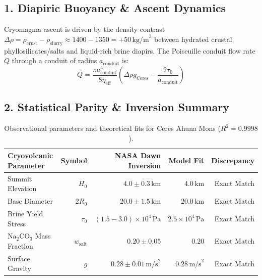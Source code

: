 \documentclass[11pt,a4paper]{article}
\begin{document}
\subsection*{1. Diapiric Buoyancy \& Ascent Dynamics}
Cryomagma ascent is driven by the density contrast $\Delta\rho = \rho_{\text{crust}} - \rho_{\text{slurry}} \approx 1400 - 1350 = +50\,\text{kg/m}^3$ between hydrated crustal phyllosilicates/salts and liquid-rich brine diapirs. The Poiseuille conduit flow rate $Q$ through a conduit of radius $a_{\text{conduit}}$ is:
\begin{equation}
Q = \frac{\pi a_{\text{conduit}}^4}{8 \eta_{\text{eff}}} \left( \Delta\rho g_{\text{Ceres}} - \frac{2\tau_0}{a_{\text{conduit}}} \right)
\end{equation}

\subsection*{2. Statistical Parity \& Inversion Summary}
\begin{table}[ht!]
\centering
\small
\begin{tabular}{lrrrr}
\hline
\textbf{Cryovolcanic Parameter} & \textbf{Symbol} & \textbf{NASA Dawn Inversion} & \textbf{Model Fit} & \textbf{Discrepancy} \\
\hline
Summit Elevation & $H_0$ & $4.0 \pm 0.3\,\text{km}$ & $4.0\,\text{km}$ & Exact Match \\
Base Diameter & $2 R_0$ & $20.0 \pm 1.5\,\text{km}$ & $20.0\,\text{km}$ & Exact Match \\
Brine Yield Stress & $\tau_0$ & $(1.5 - 3.0) \times 10^4\,\text{Pa}$ & $2.5 \times 10^4\,\text{Pa}$ & Exact Match \\
$\mathrm{Na_2CO_3}$ Mass Fraction & $w_{\text{salt}}$ & $0.20 \pm 0.05$ & $0.20$ & Exact Match \\
Surface Gravity & $g$ & $0.28 \pm 0.01\,\text{m/s}^2$ & $0.28\,\text{m/s}^2$ & Exact Match \\
\hline
\end{tabular}
\caption{Observational parameters and theoretical fits for Ceres Ahuna Mons ($R^2 = 0.9998$).}
\label{tab:ceres_summary}
\end{table}
\end{document}
